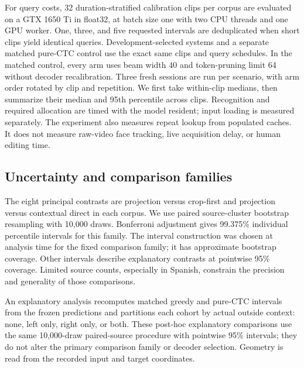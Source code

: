 For query costs, 32 duration-stratified calibration clips per corpus are
evaluated on a GTX 1650 Ti in float32, at batch size one with two CPU threads
and one GPU worker. One, three, and five
requested intervals are deduplicated when short clips yield identical queries.
Development-selected systems and a separate matched pure-CTC control use
the exact same clips and query schedules. In the matched control, every arm
uses beam width 40 and token-pruning limit 64 without decoder recalibration.
Three fresh sessions are run per scenario, with arm order rotated by clip
and repetition. We first take within-clip medians, then summarize their
median and 95th percentile across clips. Recognition and required allocation are timed
with the model resident; input loading is measured separately. The experiment
also measures repeat lookup from populated caches. It does not measure
raw-video face tracking, live acquisition delay, or human editing time.

\subsection{Uncertainty and comparison families}
The eight principal contrasts are projection versus crop-first and projection
versus contextual direct in each corpus. We use paired source-cluster
bootstrap resampling with 10,000 draws. Bonferroni adjustment gives
99.375\% individual percentile intervals for this family. The interval
construction was chosen at analysis time for the fixed comparison family;
it has approximate bootstrap coverage. Other intervals describe explanatory
contrasts at pointwise 95\% coverage. Limited source counts, especially in
Spanish, constrain the precision and generality of those comparisons.

An explanatory analysis recomputes matched greedy and pure-CTC intervals
from the frozen predictions and partitions each cohort by actual outside
context: none, left only, right only, or both. These post-hoc explanatory
comparisons use the same 10,000-draw paired-source procedure with pointwise
95\% intervals; they do not alter the primary comparison family or decoder
selection. Geometry is read from the recorded input and target coordinates.
